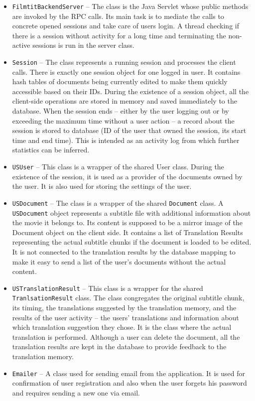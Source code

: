\begin{itemize}
\item {\tt FilmtitBackendServer}  -- The class is the Java Servlet whose public methods are invoked by the RPC calls. Its main task is to mediate the calls to concrete opened sessions and take care of users login. A thread checking if there is a session without activity for a long time and terminating the non-active sessions is run in the server class.

\item {\tt Session} -- The class represents a running session and processes the client calls. There is exactly one session object for one logged in user. It contains hash tables of documents being currently edited to make them quickly accessible based on their IDs. During the existence of a session object, all the client-side operations are stored in memory and saved immediately to the database. When the session ends -- either by the user logging out or by exceeding the maximum time without a user action -- a record about the session is stored to database (ID of the user that owned the session, its start time and end time). This is intended as an activity log from which further statistics can be inferred.

\item {\tt USUser} -- This class is a wrapper of the shared User class. During the existence of the session, it is used as a provider of the documents owned by the user. It is also used for storing the settings of the user.

\item {\tt USDocument} -- The class is a wrapper of the shared {\tt Document} class. A {\tt USDocument} object represents a subtitle file with additional information about the movie it belongs to. Its content is supposed to be a mirror image of the Document object on the client side. It contains a list of Translation Results representing the actual subtitle chunks if the document is loaded to be edited. It is not connected to the translation results by the database mapping to make it easy to send a list of the user's documents without the actual content.

\item {\tt USTranslationResult} -- This class is a wrapper for the shared {\tt TranlsationResult} class. The class congregates the original subtitle chunk, its timing, the translations suggested by the translation memory, and the results of the user activity -- the users' translations and information about which translation suggestion they chose. It is the class where the actual translation is performed. Although a user can delete the document, all the translation results are kept in the database to provide feedback to the translation memory.

\item {\tt Emailer} -- A class used for sending email from the application. It is used for confirmation of user registration and also when the user forgets his password and requires sending a new one via email.

\end{itemize}


